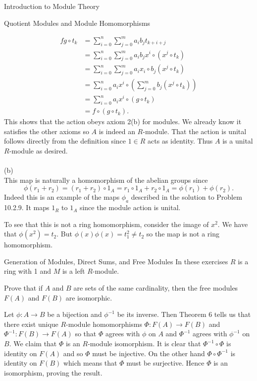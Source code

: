 \begin{chapter}{Introduction to Module Theory}
\begin{section}{Quotient Modules and Module Homomorphisms}
\begin{solution}
\begin{align*}
fg\circ t_k & = \sum_{i=0}^n\sum_{j=0}^m a_ib_j t_{k+i+j}\\
& = \sum_{i=0}^n\sum_{j=0}^m a_ib_j x^i \circ (x^j \circ t_{k})\\
& = \sum_{i=0}^n\sum_{j=0}^m a_ix_i\circ b_j \left( x^j \circ t_{k}\right)\\
& = \sum_{i=0}^na_ix^i\circ \left( \sum_{j=0}^m b_j  (x^j \circ t_{k})\right)\\
& = \sum_{i=0}^na_ix^i\circ (g\circ t_k)\\
& = f\circ(g\circ t_k). 
\end{align*}
  This shows that the action obeys axiom 2(b) for modules. We already know it satisfies the other axioms so $A$ is indeed an $R$-module. That the action is unital follows directly from the definition since $1\in R$ acts as identity. Thus $A$ is a unital $R$-module as desired.\\\\
(b)\\
This map is naturally a homomorphism of the abelian groups since \[
\phi(r_1+r_2) = (r_1+r_2)\circ 1_A = r_1\circ 1_A + r_2\circ 1_A = \phi(r_1)+\phi(r_2).
\]
Indeed this is an example of the maps $\phi_a$ described in the solution to Problem 10.2.9. It maps $1_R$ to $1_A$ since the module action is unital. 

To see that this is not a ring homomorphism, consider the image of $x^2$. We have that $\phi(x^2) = t_2$. But $\phi(x)\phi(x) = t_1^2 \neq t_2$ so the map is not a ring homomorphism.

\end{solution}\oneperpage

\end{section}









\begin{section}{Generation of Modules, Direct Sums, and Free Modules}
In these exercises $R$ is a ring with 1 and $M$ is a left $R$-module.
\begin{problem}\label{ex:10.3.1}
Prove that if $A$ and $B$ are sets of the same cardinality, then the free modules $F(A)$ and $F(B)$ are isomorphic. 
\end{problem}
\begin{solution}
Let $\phi:A\to B$ be a bijection and $\phi^{-1}$ be its inverse. Then Theorem 6 tells us that there exist unique $R$-module homomorphisms $\Phi:F(A)\to F(B)$ and $\Phi^{-1}:F(B)\to F(A)$ so that $\Phi$ agrees with $\phi$ on $A$ and $\Phi^{-1}$ agrees with $\phi^{-1}$ on $B$. We claim that $\Phi$ is an $R$-module isomorphism. It is clear that $\Phi^{-1}\circ \Phi$ is identity on $F(A)$ and so $\Phi$ must be injective. On the other hand $\Phi\circ \Phi^{-1}$ is identity on $F(B)$ which means that $\Phi$ must be surjective. Hence $\Phi$ is an isomorphism, proving the result.
\end{solution}\oneperpage




\end{section}
\end{chapter}
